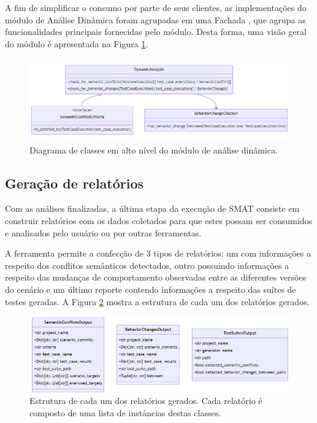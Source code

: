 \documentclass[12pt]{article}
\begin{document}
A fim de simplificar o consumo por parte de seus clientes, as implementações do módulo de Análise Dinâmica foram agrupadas em uma Fachada \cite{gof}, que agrupa as funcionalidades principais fornecidas pelo módulo. Desta forma, uma visão geral do módulo é apresentada na Figura \ref{fig:da}.

\begin{figure}[H]
    \centering
    \includegraphics[width=\textwidth]{da.png}
    \caption{Diagrama de classes em alto nível do módulo de análise dinâmica.}
    \label{fig:da}
\end{figure}

\subsection{Geração de relatórios}

Com as análises finalizadas, a última etapa da execução de SMAT consiste em construir relatórios com os dados coletados para que estes possam ser consumidos e analisados pelo usuário ou por outras ferramentas.

A ferramenta permite a confecção de 3 tipos de relatórios: um com informações a respeito dos conflitos semânticos detectados, outro possuindo informações a respeito das mudanças de comportamento  observadas entre as diferentes versões do cenário e um último reporte contendo informações a respeito das suítes de testes geradas. A Figura \ref{fig:relatorios} mostra a estrutura de cada um dos relatórios gerados.

\begin{figure}[H]
    \centering
    \includegraphics[width=\textwidth]{relatorios.png}
    \caption{Estrutura de cada um dos relatórios gerados. Cada relatório é composto de uma lista de instâncias destas classes.}
    \label{fig:relatorios}
\end{figure}
\end{document}
